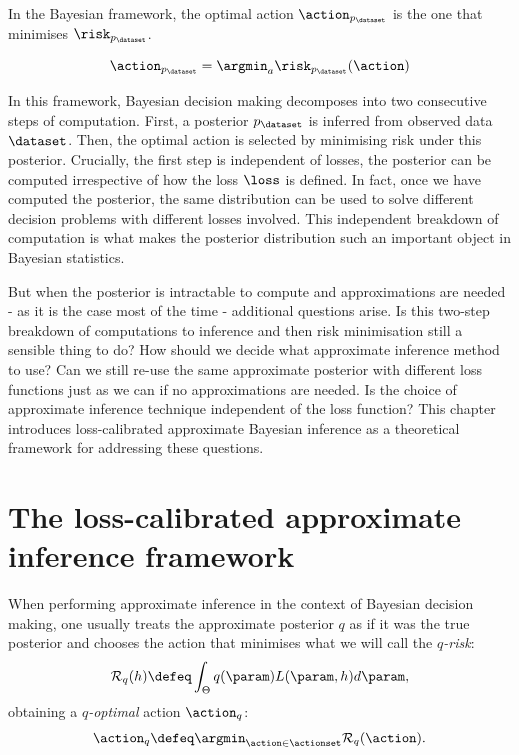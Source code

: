 In the Bayesian framework, the optimal action $\action_{p_\dataset}$ is the one that minimises $\risk_{p_\dataset}$.

\begin{equation}
	\action_{p_\dataset} = \argmin_{a} \risk_{p_\dataset}(\action)
\end{equation}

In this framework, Bayesian decision making decomposes into two consecutive steps of computation. First, a posterior $p_\dataset$ is inferred from observed data $\dataset$. Then, the optimal action is selected by minimising risk under this posterior. Crucially, the first step is independent of losses, the posterior can be computed irrespective of how the loss $\loss$ is defined. In fact, once we have computed the posterior, the same distribution can be used to solve different decision problems with different losses involved. This independent breakdown of computation is what makes the posterior distribution such an important object in Bayesian statistics.

But when the posterior is intractable to compute and approximations are needed - as it is the case most of the time - additional questions arise. Is this two-step breakdown of computations to inference and then risk minimisation still a sensible thing to do? How should we decide what approximate inference method to use? Can we still re-use the same approximate posterior with different loss functions just as we can if no approximations are needed. Is the choice of approximate inference technique independent of the loss function? This chapter introduces loss-calibrated approximate Bayesian inference as a theoretical framework for addressing these questions.

\section{The loss-calibrated approximate inference framework}

When performing approximate inference in the context of Bayesian decision making, one usually treats the approximate posterior $q$ as if it was the true posterior and chooses the action that minimises what we will call the \emph{$q$-risk}:
\begin{equation} \label{e:q-risk}
	\mathcal{R}_q(h) \defeq \int_\Theta q(\param) L(\param,h) d\param ,
\end{equation}
obtaining a \emph{$q$-optimal} action $\action_q$:
\begin{equation}
	\action_q \defeq \argmin_{\action \in \actionset} \mathcal{R}_q(\action).
\end{equation}

